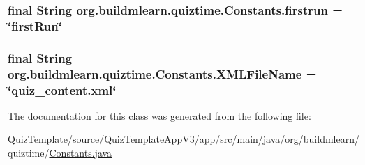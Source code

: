 \subsubsection[{\texorpdfstring{firstrun}{firstrun}}]{\setlength{\rightskip}{0pt plus 5cm}final String org.\+buildmlearn.\+quiztime.\+Constants.\+firstrun = \char`\"{}first\+Run\char`\"{}\hspace{0.3cm}{\ttfamily [static]}}\hypertarget{classorg_1_1buildmlearn_1_1quiztime_1_1Constants_a653696c8eed5f1e5d71a0db369228d5e}{}\label{classorg_1_1buildmlearn_1_1quiztime_1_1Constants_a653696c8eed5f1e5d71a0db369228d5e}
\subsubsection[{\texorpdfstring{X\+M\+L\+File\+Name}{XMLFileName}}]{\setlength{\rightskip}{0pt plus 5cm}final String org.\+buildmlearn.\+quiztime.\+Constants.\+X\+M\+L\+File\+Name = \char`\"{}quiz\+\_\+content.\+xml\char`\"{}\hspace{0.3cm}{\ttfamily [static]}}\hypertarget{classorg_1_1buildmlearn_1_1quiztime_1_1Constants_a6d969a37f1010eaca1e6760fb07dc23f}{}\label{classorg_1_1buildmlearn_1_1quiztime_1_1Constants_a6d969a37f1010eaca1e6760fb07dc23f}


The documentation for this class was generated from the following file\+:\begin{DoxyCompactItemize}
\item 
Quiz\+Template/source/\+Quiz\+Template\+App\+V3/app/src/main/java/org/buildmlearn/quiztime/\hyperlink{QuizTemplate_2source_2QuizTemplateAppV3_2app_2src_2main_2java_2org_2buildmlearn_2quiztime_2Constants_8java}{Constants.\+java}\end{DoxyCompactItemize}
